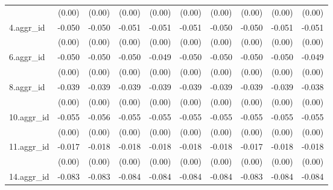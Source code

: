 {\begin{tabular}{l*{9}{c}}
          &   (0.00)         &   (0.00)         &   (0.00)         &   (0.00)         &   (0.00)         &   (0.00)         &   (0.00)         &   (0.00)         &   (0.00)         \\
[1em]
4.aggr\_id &   -0.050\sym{***}&   -0.050\sym{***}&   -0.051\sym{***}&   -0.051\sym{***}&   -0.051\sym{***}&   -0.050\sym{***}&   -0.050\sym{***}&   -0.051\sym{***}&   -0.051\sym{***}\\
          &   (0.00)         &   (0.00)         &   (0.00)         &   (0.00)         &   (0.00)         &   (0.00)         &   (0.00)         &   (0.00)         &   (0.00)         \\
[1em]
6.aggr\_id &   -0.050\sym{***}&   -0.050\sym{***}&   -0.050\sym{***}&   -0.049\sym{***}&   -0.050\sym{***}&   -0.050\sym{***}&   -0.050\sym{***}&   -0.050\sym{***}&   -0.049\sym{***}\\
          &   (0.00)         &   (0.00)         &   (0.00)         &   (0.00)         &   (0.00)         &   (0.00)         &   (0.00)         &   (0.00)         &   (0.00)         \\
[1em]
8.aggr\_id &   -0.039\sym{***}&   -0.039\sym{***}&   -0.039\sym{***}&   -0.039\sym{***}&   -0.039\sym{***}&   -0.039\sym{***}&   -0.039\sym{***}&   -0.039\sym{***}&   -0.038\sym{***}\\
          &   (0.00)         &   (0.00)         &   (0.00)         &   (0.00)         &   (0.00)         &   (0.00)         &   (0.00)         &   (0.00)         &   (0.00)         \\
[1em]
10.aggr\_id&   -0.055\sym{***}&   -0.056\sym{***}&   -0.055\sym{***}&   -0.055\sym{***}&   -0.055\sym{***}&   -0.055\sym{***}&   -0.055\sym{***}&   -0.055\sym{***}&   -0.055\sym{***}\\
          &   (0.00)         &   (0.00)         &   (0.00)         &   (0.00)         &   (0.00)         &   (0.00)         &   (0.00)         &   (0.00)         &   (0.00)         \\
[1em]
11.aggr\_id&   -0.017\sym{***}&   -0.018\sym{***}&   -0.018\sym{***}&   -0.018\sym{***}&   -0.018\sym{***}&   -0.018\sym{***}&   -0.017\sym{***}&   -0.018\sym{***}&   -0.018\sym{***}\\
          &   (0.00)         &   (0.00)         &   (0.00)         &   (0.00)         &   (0.00)         &   (0.00)         &   (0.00)         &   (0.00)         &   (0.00)         \\
[1em]
14.aggr\_id&   -0.083\sym{***}&   -0.083\sym{***}&   -0.084\sym{***}&   -0.084\sym{***}&   -0.084\sym{***}&   -0.084\sym{***}&   -0.083\sym{***}&   -0.084\sym{***}&   -0.084\sym{***}\\

\end{tabular}}
